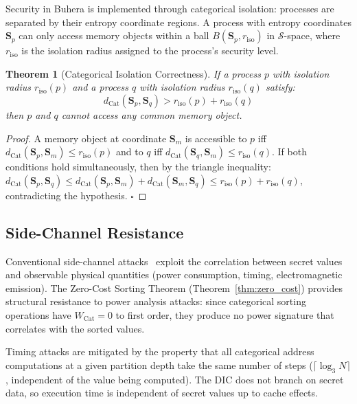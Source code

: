 \documentclass[12pt,twocolumn]{article}
\newtheorem{theorem}{Theorem}[section]
\DeclareMathOperator{\Cat}{Cat}
\begin{document}
Security in Buhera is implemented through categorical isolation: processes are separated by their entropy coordinate regions. A process with entropy coordinates $\mathbf{S}_p$ can only access memory objects within a ball $B(\mathbf{S}_p, r_{\text{iso}})$ in $\mathcal{S}$-space, where $r_{\text{iso}}$ is the isolation radius assigned to the process's security level.

\begin{theorem}[Categorical Isolation Correctness]
If a process $p$ with isolation radius $r_{\text{iso}}(p)$ and a process $q$ with isolation radius $r_{\text{iso}}(q)$ satisfy:
\begin{equation}
d_{\Cat}(\mathbf{S}_p, \mathbf{S}_q) > r_{\text{iso}}(p) + r_{\text{iso}}(q)
\end{equation}
then $p$ and $q$ cannot access any common memory object.
\end{theorem}

\begin{proof}
A memory object at coordinate $\mathbf{S}_m$ is accessible to $p$ iff $d_{\Cat}(\mathbf{S}_p, \mathbf{S}_m) \leq r_{\text{iso}}(p)$ and to $q$ iff $d_{\Cat}(\mathbf{S}_q, \mathbf{S}_m) \leq r_{\text{iso}}(q)$. If both conditions hold simultaneously, then by the triangle inequality:
$d_{\Cat}(\mathbf{S}_p, \mathbf{S}_q) \leq d_{\Cat}(\mathbf{S}_p, \mathbf{S}_m) + d_{\Cat}(\mathbf{S}_m, \mathbf{S}_q) \leq r_{\text{iso}}(p) + r_{\text{iso}}(q)$,
contradicting the hypothesis. $\square$
\end{proof}

\subsection{Side-Channel Resistance}

Conventional side-channel attacks~\cite{kocher1999differential} exploit the correlation between secret values and observable physical quantities (power consumption, timing, electromagnetic emission). The Zero-Cost Sorting Theorem (Theorem~\ref{thm:zero_cost}) provides structural resistance to power analysis attacks: since categorical sorting operations have $W_{\Cat} = 0$ to first order, they produce no power signature that correlates with the sorted values.

Timing attacks are mitigated by the property that all categorical address computations at a given partition depth take the same number of steps ($\lceil \log_3 N \rceil$, independent of the value being computed). The DIC does not branch on secret data, so execution time is independent of secret values up to cache effects.
\end{document}
